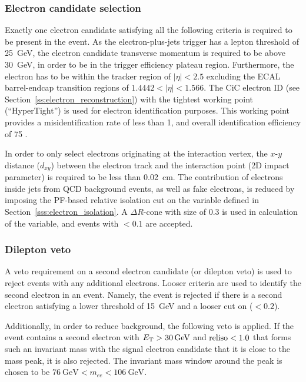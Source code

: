 \subsubsection*{Electron candidate selection}
Exactly one electron candidate satisfying all the following criteria is required to be present in the event. As the
electron-plus-jets trigger has a lepton \pt threshold of \SI{25}{\GeV}, the electron candidate transverse momentum is
required to be above \SI{30}{\GeV}, in order to be in the trigger efficiency plateau region. Furthermore, the electron
has to be within the tracker region of $|\eta| < 2.5$ excluding the ECAL barrel-endcap transition regions of $1.4442 <
|\eta| < 1.566$. The CiC electron ID (see Section~\ref{ss:electron_reconstruction}) with the tightest working point
(``HyperTight'') is used for electron identification purposes. This working point provides a misidentification rate of
less than \SI{1}{\pc}, and overall identification efficiency of \SI{75}{\pc} \autocite{CiC_ID}.

In order to only select electrons originating at the interaction vertex, the $x$-$y$ distance ($d_{xy}$) between the
electron track and the interaction point (2D impact parameter) is required to be less than \SI{0.02}{\cm}. The
contribution of electrons inside jets from QCD background events, as well as fake electrons, is reduced by imposing the
PF-based relative isolation cut on the variable \reliso defined in Section~\ref{sss:electron_isolation}. A $\Delta
R$-cone with size of \num{0.3} is used in calculation of the \reliso variable, and events with \reliso $< 0.1$ are
accepted.

\subsubsection*{Dilepton veto}
A veto requirement on a second electron candidate (or dilepton veto) is used to reject events with any additional
electrons. Looser criteria are used to identify the second electron in an event. Namely, the event is rejected if there
is a second electron satisfying a lower \ET threshold of \SI{15}{\GeV} and a looser cut on \reliso ($<0.2$).

Additionally, in order to reduce \ZpJets background, the following veto is applied. If the event contains a second
electron with $\ET > \SI{30}{\GeV}$ and $\textrm{reliso} < 1.0$ that forms such an invariant mass with the signal electron
candidate that it is close to the \Z mass peak, it is also rejected. The invariant mass window around the \Z peak is
chosen to be $\SI{76}{\GeV} < m_{ee} < \SI{106}{\GeV}$.

